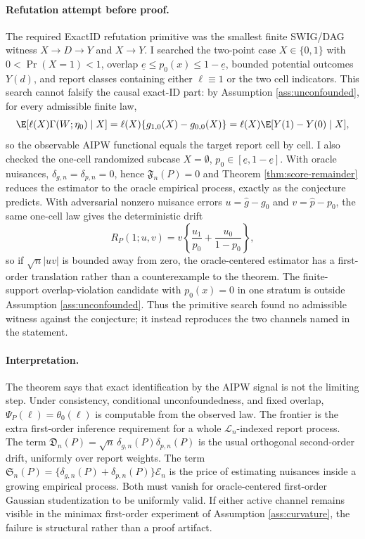 \paragraph{Refutation attempt before proof.}
The required ExactID refutation primitive was the smallest finite SWIG/DAG
witness \(X\to D\to Y\) and \(X\to Y\).  I searched the two-point case
\(X\in\{0,1\}\) with \(0<\Pr(X=1)<1\), overlap
\(\underline e\le p_0(x)\le1-\underline e\), bounded potential outcomes
\(Y(d)\), and report classes containing either \(\ell\equiv1\) or the two cell
indicators.  This search cannot falsify the causal exact-ID part: by
Assumption \ref{ass:unconfounded}, for every admissible finite law,
\[
\E[\ell(X)\Gamma(W;\eta_0)\mid X]
=\ell(X)\{g_{1,0}(X)-g_{0,0}(X)\}
=\ell(X)\E[Y(1)-Y(0)\mid X],
\]
so the observable AIPW functional equals the target report cell by cell.  I
also checked the one-cell randomized subcase \(X=\emptyset\), \(p_0\in
[\underline e,1-\underline e]\).  With oracle nuisances, \(\delta_{g,n}=
\delta_{p,n}=0\), hence \(\mathfrak{F}_n(P)=0\) and Theorem
\ref{thm:score-remainder} reduces the estimator to the oracle empirical
process, exactly as the conjecture predicts.  With adversarial nonzero nuisance
errors \(u=\hat g-g_0\) and \(v=\hat p-p_0\), the same one-cell law gives the
deterministic drift
\[
R_P(1;u,v)
=v\left\{\frac{u_1}{p_0}+\frac{u_0}{1-p_0}\right\},
\]
so if \(\sqrt n|uv|\) is bounded away from zero, the oracle-centered estimator
has a first-order translation rather than a counterexample to the theorem.  The
finite-support overlap-violation candidate with \(p_0(x)=0\) in one stratum is
outside Assumption \ref{ass:unconfounded}.  Thus the primitive search found no
admissible witness against the conjecture; it instead reproduces the two
channels named in the statement.

\paragraph{Interpretation.}
The theorem says that exact identification by the AIPW signal is not the
limiting step.  Under consistency, conditional unconfoundedness, and fixed
overlap, \(\Psi_P(\ell)=\theta_0(\ell)\) is computable from the observed law.
The frontier is the extra first-order inference requirement for a whole
\(\mathcal{L}_n\)-indexed report process.  The term
\(\mathfrak{D}_n(P)=\sqrt n\,\delta_{g,n}(P)\delta_{p,n}(P)\) is the usual
orthogonal second-order drift, uniformly over report weights.  The term
\(\mathfrak{S}_n(P)=\{\delta_{g,n}(P)+\delta_{p,n}(P)\}\mathcal{E}_n\) is the
price of estimating nuisances inside a growing empirical process.  Both must
vanish for oracle-centered first-order Gaussian studentization to be uniformly
valid.  If either active channel remains visible in the minimax first-order
experiment of Assumption \ref{ass:curvature}, the failure is structural rather
than a proof artifact.

